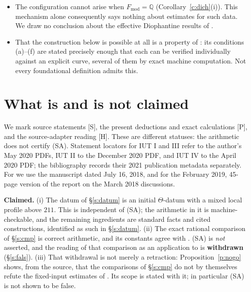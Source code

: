 \documentclass[11pt]{article}
\theoremstyle{plain}
\theoremstyle{definition}
\newcommand{\Fmod}{F_{\mathrm{mod}}}
\newcommand{\SA}{\textup{(SA)}}
\begin{document}
\begin{itemize}[itemsep=2pt]
\item The configuration cannot arise when $\Fmod=\mathbb{Q}$
 (Corollary~\ref{c:dich}(i)).  This mechanism alone consequently says nothing
 about estimates for such data.  We draw no conclusion about the effective
 Diophantine results of \cite{MFHMP}.
\item That the construction below is possible at all is a property of
 \cite[Def.~3.1]{IUT1}: its conditions (a)--(f) are stated precisely enough that
 each can be verified individually against an explicit curve, several of them by
 exact machine computation.  Not every foundational definition admits this.
\end{itemize}

\section{What is and is not claimed}\label{s:scope}

We mark source statements \textup{[S]}, the present deductions and exact
calculations \textup{[P]}, and the source-adapter reading \textup{[H]}.
These are different statuses: the arithmetic does not certify \SA{}.
Statement locators for IUT I and III refer to the author's May 2020 PDFs,
IUT II to the December 2020 PDF, and IUT IV to the April 2020 PDF; the bibliography records their
2021 publication metadata separately.  For \cite{SS} we use the manuscript
dated July 16, 2018, and for \cite{Rpt} the February 2019, 45-page version
of the report on the March 2018 discussions.

\noindent\textbf{Claimed.}  (i) The datum of \S\ref{s:datum} is an initial
$\Theta$-datum with a mixed local profile above $211$.  This is independent of \SA{}; the arithmetic
in it is machine-checkable, and the remaining ingredients are standard facts and
cited constructions, identified as such in \S\ref{s:datum}.  (ii) The exact
rational comparison of \S\ref{s:cmp} is correct arithmetic, and its constants
agree with \cite[Prop.~1.1, Prop.~1.2, Prop.~1.4]{IUT4}.  \SA{} is \emph{not}
asserted, and the reading of that comparison as an application to \cite{IUT4} is
\textbf{withdrawn} (\S\ref{s:fals}).  (iii) That withdrawal is not merely a
retraction: Proposition~\ref{p:nogo} shows, from the source, that the
comparisons of \S\ref{s:cmp} do not by themselves refute the fixed-input
estimates of \cite[Prop.~1.2, Prop.~1.4]{IUT4}.  Its scope is stated with it; in
particular \SA{} is not shown to be false.
\end{document}
